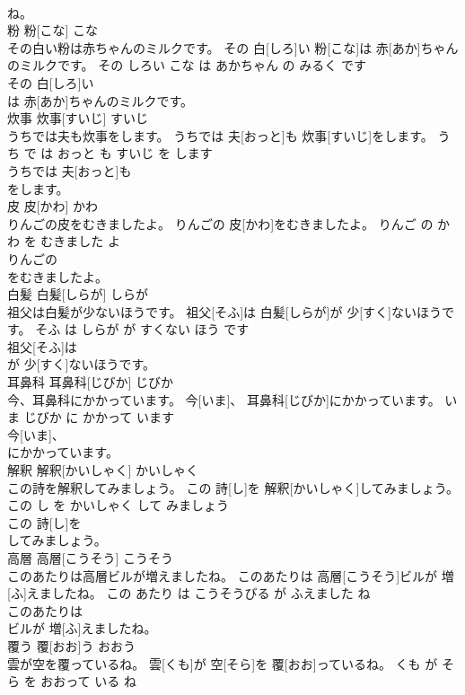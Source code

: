 \documentclass[8pt]{extreport}
\begin{document}
\begin{CJK}{UTF8}{min}
\\	ね。			
\\	粉	粉[こな]	こな	
\\	その白い粉は赤ちゃんのミルクです。	その 白[しろ]い 粉[こな]は 赤[あか]ちゃんのミルクです。	その しろい こな は あかちゃん の みるく です	
\\	その 白[しろ]い
\\	は 赤[あか]ちゃんのミルクです。			
\\	炊事	炊事[すいじ]	すいじ	
\\	うちでは夫も炊事をします。	うちでは 夫[おっと]も 炊事[すいじ]をします。	うち で は おっと も すいじ を します	
\\	うちでは 夫[おっと]も
\\	をします。			
\\	皮	皮[かわ]	かわ	
\\	りんごの皮をむきましたよ。	りんごの 皮[かわ]をむきましたよ。	りんご の かわ を むきました よ	
\\	りんごの
\\	をむきましたよ。			
\\	白髪	白髪[しらが]	しらが	
\\	祖父は白髪が少ないほうです。	祖父[そふ]は 白髪[しらが]が 少[すく]ないほうです。	そふ は しらが が すくない ほう です	
\\	祖父[そふ]は
\\	が 少[すく]ないほうです。			
\\	耳鼻科	耳鼻科[じびか]	じびか	
\\	今、耳鼻科にかかっています。	今[いま]、 耳鼻科[じびか]にかかっています。	いま じびか に かかって います	
\\	今[いま]、
\\	にかかっています。			
\\	解釈	解釈[かいしゃく]	かいしゃく	
\\	この詩を解釈してみましょう。	この 詩[し]を 解釈[かいしゃく]してみましょう。	この し を かいしゃく して みましょう	
\\	この 詩[し]を
\\	してみましょう。			
\\	高層	高層[こうそう]	こうそう	
\\	このあたりは高層ビルが増えましたね。	このあたりは 高層[こうそう]ビルが 増[ふ]えましたね。	この あたり は こうそうびる が ふえました ね	
\\	このあたりは
\\	ビルが 増[ふ]えましたね。			
\\	覆う	覆[おお]う	おおう	
\\	雲が空を覆っているね。	雲[くも]が 空[そら]を 覆[おお]っているね。	くも が そら を おおって いる ね	

\end{CJK}
\end{document}
